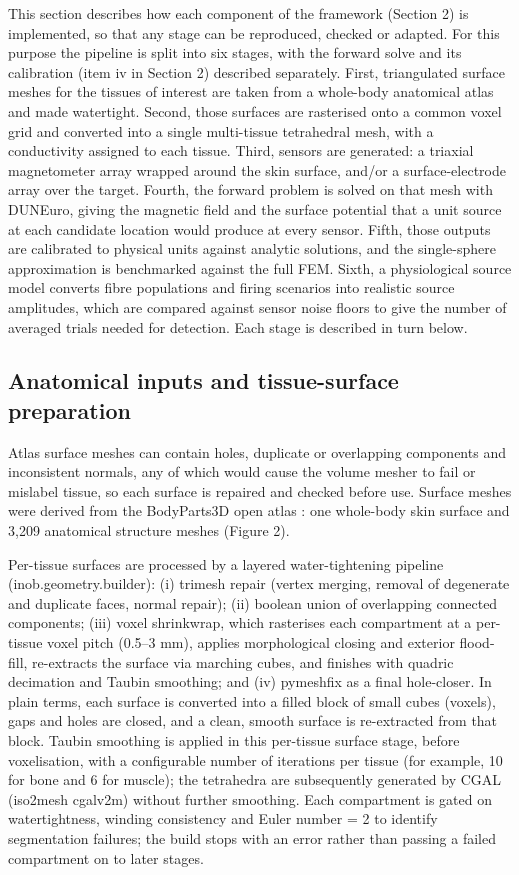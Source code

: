 \documentclass[11pt]{article}
\begin{document}
This section describes how each component of the framework (Section 2)
is implemented, so that any stage can be reproduced, checked or adapted.
For this purpose the pipeline is split into six stages, with the forward
solve and its calibration (item iv in Section 2) described separately.
First, triangulated surface meshes for the tissues of interest are taken
from a whole-body anatomical atlas and made watertight. Second, those
surfaces are rasterised onto a common voxel grid and converted into a
single multi-tissue tetrahedral mesh, with a conductivity assigned to
each tissue. Third, sensors are generated: a triaxial magnetometer array
wrapped around the skin surface, and/or a surface-electrode array over
the target. Fourth, the forward problem is solved on that mesh with
DUNEuro, giving the magnetic field and the surface potential that a unit
source at each candidate location would produce at every sensor. Fifth,
those outputs are calibrated to physical units against analytic
solutions, and the single-sphere approximation is benchmarked against
the full FEM. Sixth, a physiological source model converts fibre
populations and firing scenarios into realistic source amplitudes, which
are compared against sensor noise floors to give the number of averaged
trials needed for detection. Each stage is described in turn below.

\subsection{Anatomical inputs and tissue-surface
preparation}\label{anatomical-inputs-and-tissue-surface-preparation}

Atlas surface meshes can contain holes, duplicate or overlapping
components and inconsistent normals, any of which would cause the volume
mesher to fail or mislabel tissue, so each surface is repaired and
checked before use. Surface meshes were derived from the BodyParts3D
open atlas \citep{241}:
one whole-body skin surface and 3,209 anatomical structure meshes
(Figure 2).

Per-tissue surfaces are processed by a layered water-tightening pipeline
(inob.geometry.builder): (i) trimesh repair (vertex merging, removal of
degenerate and duplicate faces, normal repair); (ii) boolean union of
overlapping connected components; (iii) voxel shrinkwrap, which
rasterises each compartment at a per-tissue voxel pitch (0.5--3 mm),
applies morphological closing and exterior flood-fill, re-extracts the
surface via marching cubes, and finishes with quadric decimation and
Taubin smoothing; and (iv) pymeshfix as a final hole-closer. In plain terms, each surface is
converted into a filled block of small cubes (voxels), gaps and holes
are closed, and a clean, smooth surface is re-extracted from that block. Taubin
smoothing is applied in this per-tissue surface stage, before
voxelisation, with a configurable number of iterations per tissue (for
example, 10 for bone and 6 for muscle); the tetrahedra are subsequently
generated by CGAL (iso2mesh cgalv2m) without further smoothing. Each
compartment is gated on watertightness, winding consistency and Euler
number = 2 to identify segmentation failures; the build stops with an
error rather than passing a failed compartment on to later stages.
\end{document}
